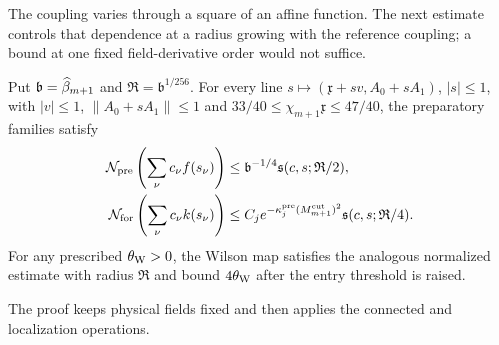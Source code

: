 The coupling varies through a square of an affine function. The next estimate controls that dependence at a radius growing with the reference coupling; a bound at one fixed field-derivative order would not suffice.
\begin{lemma}\label{lem:D-coupling-stencil}
Put $\mathfrak b=\widehat{\beta}_{m+1}$ and $\mathfrak R=\mathfrak b^{1/256}$. For every line $s\mapsto(\mathfrak x+sv,A_0+sA_1)$, $|s|\le1$, with $|v|\le1$, $\|A_0+sA_1\|\le1$ and $33/40\le\chi_{m+1}\mathfrak x\le47/40$, the preparatory families satisfy
\begin{align*}
\mathcal N_{\rm pre}\left(\sum_\nu c_\nu f(s_\nu)\right)
&\le\mathfrak b^{-1/4}\mathfrak s(c,s;\mathfrak R/2),\\
\mathcal N_{\rm for}\left(\sum_\nu c_\nu k(s_\nu)\right)
&\le C_j e^{-\kappa_j^{\rm pre}(M^{\mathrm{cut}}_{m+1})^2}\mathfrak s(c,s;\mathfrak R/4).
\end{align*}
For any prescribed $\theta_{\rm W}>0$, the Wilson map satisfies the analogous normalized estimate with radius $\mathfrak R$ and bound $4\theta_{\rm W}$ after the entry threshold is raised.
\end{lemma}
The proof keeps physical fields fixed and then applies the connected and localization operations.
